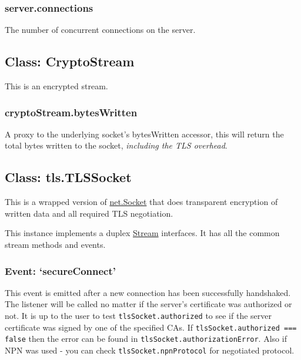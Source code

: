 \subsubsection{server.connections}

The number of concurrent connections on the server.

\subsection{Class: CryptoStream}

\begin{Shaded}
\begin{Highlighting}[]
\NormalTok{: } \NormalTok{- } 
\end{Highlighting}
\end{Shaded}

This is an encrypted stream.

\subsubsection{cryptoStream.bytesWritten}

A proxy to the underlying socket's bytesWritten accessor, this will
return the total bytes written to the socket, \emph{including the TLS
overhead}.

\subsection{Class: tls.TLSSocket}

This is a wrapped version of
\href{net.html\#net\_class\_net\_socket}{net.Socket} that does
transparent encryption of written data and all required TLS negotiation.

This instance implements a duplex
\href{stream.html\#stream\_stream}{Stream} interfaces. It has all the
common stream methods and events.

\subsubsection{Event: `secureConnect'}

This event is emitted after a new connection has been successfully
handshaked. The listener will be called no matter if the server's
certificate was authorized or not. It is up to the user to test
\texttt{tlsSocket.authorized} to see if the server certificate was
signed by one of the specified CAs. If
\texttt{tlsSocket.authorized === false} then the error can be found in
\texttt{tlsSocket.authorizationError}. Also if NPN was used - you can
check \texttt{tlsSocket.npnProtocol} for negotiated protocol.

